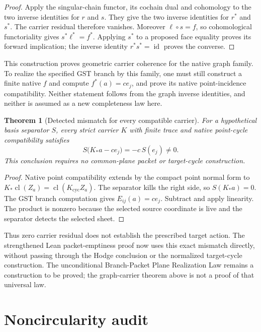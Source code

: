 \documentclass[11pt]{article}
\newtheorem{theorem}[definition]{Theorem}
\newcommand{\cl}{\operatorname{cl}}
\begin{document}
\begin{proof}
Apply the singular-chain functor, its cochain dual and cohomology to the two
inverse identities for $r$ and $s$.  They give the two inverse identities for
$r^*$ and $s^*$.  The carrier residual therefore vanishes.  Moreover
$\ell\circ s=f$, so cohomological functoriality gives $s^*\ell^*=f^*$.
Applying $s^*$ to a proposed face equality proves its forward implication;
the inverse identity $r^*s^*=\operatorname{id}$ proves the converse.
\end{proof}

This construction proves geometric carrier coherence for the native graph
family.  To realize the specified GST branch by this family, one must still
construct a finite native $f$ and compute $f^*(a)=c e_j$, and prove its native
point-incidence compatibility.  Neither statement follows from the graph
inverse identities, and neither is assumed as a new completeness law here.

\begin{theorem}[Detected mismatch for every compatible carrier]
For a hypothetical basis separator $S$, every strict carrier $K$ with finite
trace and native point-cycle compatibility satisfies
\[
  S\bigl(K_*a-c e_j\bigr)=-c\,S(e_j)\ne0.
\]
This conclusion requires no common-plane packet or target-cycle construction.
\end{theorem}

\begin{proof}
Native point compatibility extends by the compact point normal form to
$K_*\cl(Z_a)=\cl(K_{\mathrm{cyc}}Z_a)$.  The separator kills the right side,
so $S(K_*a)=0$.  The GST branch computation gives $E_{ij}(a)=c e_j$.
Subtract and apply linearity.  The product is nonzero because the selected
source coordinate is live and the separator detects the selected sheet.
\end{proof}

Thus zero carrier residual does not establish the prescribed target action.
The strengthened Lean packet-emptiness proof now uses this exact mismatch
directly, without passing through the Hodge conclusion or the normalized
target-cycle construction.  The unconditional Branch-Packet Plane Realization
Law remains a construction to be proved; the graph-carrier theorem above is
not a proof of that universal law.

\section{Noncircularity audit}
\end{document}
